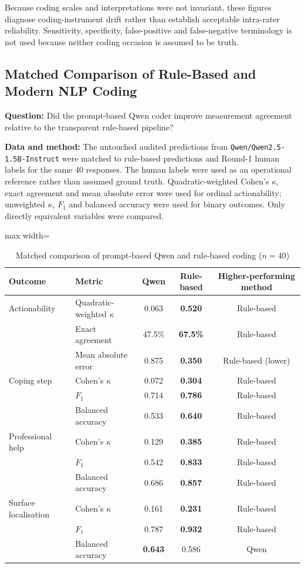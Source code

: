Because coding scales and interpretations were not invariant, these figures diagnose coding-instrument drift rather than establish acceptable intra-rater reliability. Sensitivity, specificity, false-positive and false-negative terminology is not used because neither coding occasion is assumed to be truth.

\subsection{Matched Comparison of Rule-Based and Modern NLP Coding}

\textbf{Question:} Did the prompt-based Qwen coder improve measurement agreement relative to the transparent rule-based pipeline?

\textbf{Data and method:} The untouched audited predictions from \texttt{Qwen/Qwen2.5-1.5B-Instruct} were matched to rule-based predictions and Round-1 human labels for the same 40 responses. The human labels were used as an operational reference rather than assumed ground truth. Quadratic-weighted Cohen's $\kappa$, exact agreement and mean absolute error were used for ordinal actionability; unweighted $\kappa$, $F_1$ and balanced accuracy were used for binary outcomes. Only directly equivalent variables were compared.

\begin{table}[H]
\centering
\caption{Matched comparison of prompt-based Qwen and rule-based coding ($n=40$)}
\label{tab:qwen_rule_comparison}
\begin{adjustbox}{max width=\textwidth}
\begin{tabular}{llccc}
\toprule
Outcome & Metric & Qwen & Rule-based & Higher-performing method \\
\midrule
Actionability & Quadratic-weighted $\kappa$ & 0.063 & \textbf{0.520} & Rule-based \\
 & Exact agreement & 47.5\% & \textbf{67.5\%} & Rule-based \\
 & Mean absolute error & 0.875 & \textbf{0.350} & Rule-based (lower) \\
\addlinespace
Coping step & Cohen's $\kappa$ & 0.072 & \textbf{0.304} & Rule-based \\
 & $F_1$ & 0.714 & \textbf{0.786} & Rule-based \\
 & Balanced accuracy & 0.533 & \textbf{0.640} & Rule-based \\
\addlinespace
Professional help & Cohen's $\kappa$ & 0.129 & \textbf{0.385} & Rule-based \\
 & $F_1$ & 0.542 & \textbf{0.833} & Rule-based \\
 & Balanced accuracy & 0.686 & \textbf{0.857} & Rule-based \\
\addlinespace
Surface localisation & Cohen's $\kappa$ & 0.161 & \textbf{0.231} & Rule-based \\
 & $F_1$ & 0.787 & \textbf{0.932} & Rule-based \\
 & Balanced accuracy & \textbf{0.643} & 0.586 & Qwen \\
\bottomrule
\end{tabular}
\end{adjustbox}
\end{table}

